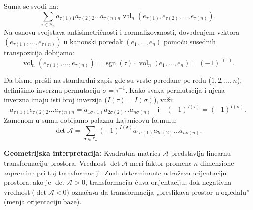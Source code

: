 \documentclass[a4paper,12pt,twoside]{report}
\numberwithin{algorithm}{section}
\begin{document}
Suma se svodi na:
\[
\sum_{\tau \in \mathbb{S}_n} a_{\tau(1) 1} a_{\tau(2) 2} \dots a_{\tau(n) n} \operatorname{vol}_n (e_{\tau(1)}, e_{\tau(2)}, \dots, e_{\tau(n)}).
\]
Na osnovu svojstava antisimetričnosti i normalizovanosti, dovođenjem vektora $(e_{\tau(1)}, \dots, e_{\tau(n)})$ u kanonski poredak $(e_1, \dots, e_n)$ pomoću susednih transpozicija dobijamo:
\[
\operatorname{vol}_n (e_{\tau(1)}, \dots, e_{\tau(n)}) = \operatorname{sgn}(\tau) \cdot \operatorname{vol}_n(e_1, \dots, e_n) = (-1)^{I(\tau)}.
\]

Da bismo prešli na standardni zapis gde su vrste poređane po redu ($1, 2, \dots, n$), definišimo inverznu permutaciju $\sigma = \tau^{-1}$. Kako svaka permutacija i njena inverzna imaju isti broj inverzija ($I(\tau) = I(\sigma)$), važi:
\[
a_{\tau(1) 1} a_{\tau(2) 2} \dots a_{\tau(n) n} = a_{1 \sigma(1)} a_{2 \sigma(2)} \dots a_{n \sigma(n)} \quad \text{i} \quad (-1)^{I(\tau)} = (-1)^{I(\sigma)}.
\]
Zamenom u sumu dobijamo polaznu Lajbnicovu formulu:
\[
\det \mathcal{A} = \sum_{\sigma \in \mathbb{S}_n} (-1)^{I(\sigma)} a_{1\sigma(1)} a_{2\sigma(2)} \dots a_{n\sigma(n)}.
\]

\medskip
\noindent\textbf{Geometrijska interpretacija:}
Kvadratna matrica $\mathcal{A}$ predstavlja linearnu transformaciju prostora. Vrednost $\det \mathcal{A}$ meri faktor promene $n$-dimenzione zapremine pri toj transformaciji. Znak determinante odražava orijentaciju prostora: ako je $\det \mathcal{A} > 0$, transformacija čuva orijentaciju, dok negativna vrednost ($\det \mathcal{A} < 0$) označava da transformacija „preslikava prostor u ogledalu” (menja orijentaciju baze).
\end{document}
